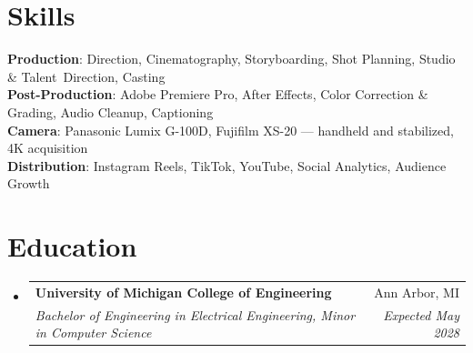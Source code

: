 \documentclass[letterpaper,11pt]{article}
\makeatletter
\newcommand{\resumeSubheading}[4]{
  \vspace{-2pt}\item
    \begin{tabular*}{0.97\textwidth}[t]{l@{\extracolsep{\fill}}r}
      \textbf{#1} & #2 \\
      \textit{\small#3} & \textit{\small #4} \\
    \end{tabular*}\vspace{-7pt}
}
\newcommand{\resumeSubHeadingListStart}{\begin{itemize}[leftmargin=0.15in, label={}]}
\newcommand{\resumeSubHeadingListEnd}{\end{itemize}}
\makeatother
\begin{document}
\section{Skills}
 \begin{itemize}[leftmargin=0.15in, label={}]
    \small{\item{
     \raggedright
     \textbf{Production}{: Direction, Cinematography, Storyboarding, Shot Planning, Studio \& Talent~Direction, Casting} \\
     \textbf{Post-Production}{: Adobe Premiere Pro, After Effects, Color Correction \& Grading, Audio Cleanup, Captioning} \\
     \textbf{Camera}{: Panasonic Lumix G-100D, Fujifilm XS-20 --- handheld and stabilized, 4K acquisition} \\
     \textbf{Distribution}{: Instagram Reels, TikTok, YouTube, Social Analytics, Audience Growth}
    }}
 \end{itemize}


\section{Education}
  \resumeSubHeadingListStart
    \resumeSubheading
      {University of Michigan College of Engineering}{Ann Arbor, MI}
      {Bachelor of Engineering in Electrical Engineering, Minor in Computer Science}{Expected May 2028}
  \resumeSubHeadingListEnd

\end{document}
